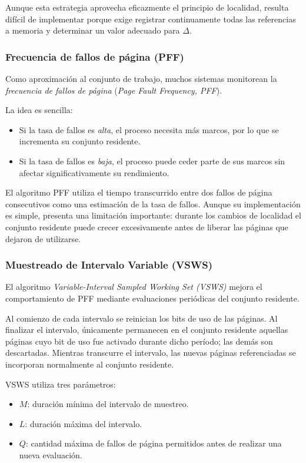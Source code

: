 Aunque esta estrategia aprovecha eficazmente el principio de localidad, resulta difícil de implementar porque exige registrar continuamente todas las referencias a memoria y determinar un valor adecuado para \(\Delta\).

\subsubsection{Frecuencia de fallos de página (PFF)}

Como aproximación al conjunto de trabajo, muchos sistemas monitorean la \textit{frecuencia de fallos de página} (\textit{Page Fault Frequency, PFF}).

La idea es sencilla:
\begin{itemize}
  \item Si la tasa de fallos es \textit{alta}, el proceso necesita más marcos, por lo que se incrementa su conjunto residente.
  \item Si la tasa de fallos es \textit{baja}, el proceso puede ceder parte de sus marcos sin afectar significativamente su rendimiento.
\end{itemize}

El algoritmo PFF utiliza el tiempo transcurrido entre dos fallos de página consecutivos como una estimación de la tasa de fallos. Aunque su implementación es simple, presenta una limitación importante: durante los cambios de localidad el conjunto residente puede crecer excesivamente antes de liberar las páginas que dejaron de utilizarse.

\subsubsection{Muestreado de Intervalo Variable (VSWS)}

El algoritmo \textit{Variable-Interval Sampled Working Set (VSWS)} mejora el comportamiento de PFF mediante evaluaciones periódicas del conjunto residente.

Al comienzo de cada intervalo se reinician los bits de uso de las páginas. Al finalizar el intervalo, únicamente permanecen en el conjunto residente aquellas páginas cuyo bit de uso fue activado durante dicho período; las demás son descartadas. Mientras transcurre el intervalo, las nuevas páginas referenciadas se incorporan normalmente al conjunto residente.

VSWS utiliza tres parámetros:
\begin{itemize}
  \item \(M\): duración mínima del intervalo de muestreo.
  \item \(L\): duración máxima del intervalo.
  \item \(Q\): cantidad máxima de fallos de página permitidos antes de realizar una nueva evaluación.
\end{itemize}

